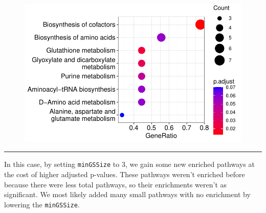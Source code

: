 \documentclass[
  24px,
  letterpaper,
  DIV=11,
  numbers=noendperiod]{scrartcl}
\newenvironment{Shaded}{\begin{snugshade}}{\end{snugshade}}
\newcommand{\AttributeTok}[1]{\textcolor[rgb]{0.40,0.45,0.13}{#1}}
\newcommand{\DecValTok}[1]{\textcolor[rgb]{0.68,0.00,0.00}{#1}}
\newcommand{\FloatTok}[1]{\textcolor[rgb]{0.68,0.00,0.00}{#1}}
\newcommand{\FunctionTok}[1]{\textcolor[rgb]{0.28,0.35,0.67}{#1}}
\newcommand{\NormalTok}[1]{\textcolor[rgb]{0.00,0.23,0.31}{#1}}
\newcommand{\OtherTok}[1]{\textcolor[rgb]{0.00,0.23,0.31}{#1}}
\newcommand{\SpecialCharTok}[1]{\textcolor[rgb]{0.37,0.37,0.37}{#1}}
\begin{document}
\begin{Shaded}
\end{Shaded}

\begin{figure}[H]

{\centering \includegraphics{index_files/figure-pdf/unnamed-chunk-26-1.pdf}

}

\end{figure}

\begin{center}\rule{0.5\linewidth}{0.5pt}\end{center}

In this case, by setting \texttt{minGSSize} to 3, we gain some new
enriched pathways at the cost of higher adjusted p-values. These
pathways weren't enriched before because there were less total pathways,
so their enrichments weren't as significant. We most likely added many
small pathways with no enrichment by lowering the \texttt{minGSSize}.
\end{document}
